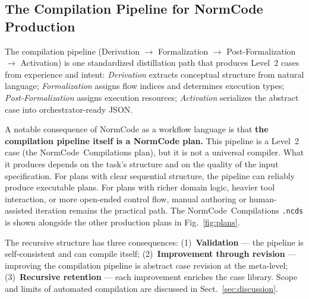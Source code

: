\subsection{The Compilation Pipeline for NormCode Production}
\label{sec:level2:distillation}

The compilation pipeline (Derivation $\rightarrow$ Formalization $\rightarrow$
Post-Formalization $\rightarrow$ Activation) is one standardized distillation path that
produces Level~2 cases from experience and intent: \textit{Derivation} extracts
conceptual structure from natural language; \textit{Formalization} assigns flow indices
and determines execution types; \textit{Post-Formalization} assigns execution resources;
\textit{Activation} serializes the abstract case into orchestrator-ready JSON.

A notable consequence of NormCode as a workflow language is that \textbf{the
compilation pipeline itself is a NormCode plan.} This pipeline is a Level~2 case
(the NormCode~Compilations plan), but it is not a universal compiler. What it produces
depends on the task's structure and on the quality of the input specification. For
plans with clear sequential structure, the pipeline can reliably produce executable
plans. For plans with richer domain logic, heavier tool interaction, or more open-ended
control flow, manual authoring or human-assisted iteration remains the practical path.
The NormCode~Compilations \texttt{.ncds} is shown alongside the other production plans in
Fig.~\ref{fig:plans}.

The recursive structure has three consequences: (1)~\textbf{Validation} --- the pipeline
is self-consistent and can compile itself; (2)~\textbf{Improvement through revision} ---
improving the compilation pipeline is abstract case revision at the meta-level;
(3)~\textbf{Recursive retention} --- each improvement enriches the case library. Scope
and limits of automated compilation are discussed in Sect.~\ref{sec:discussion}.
